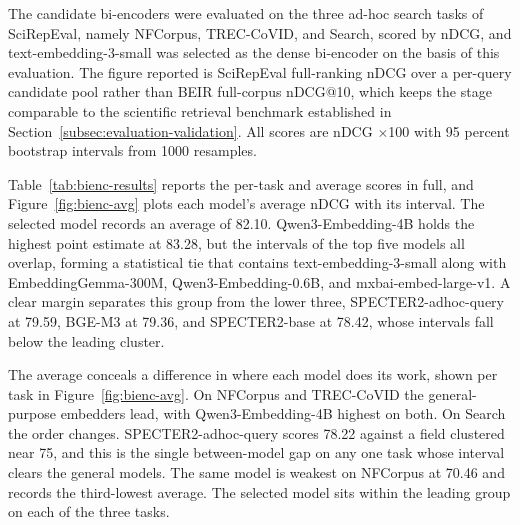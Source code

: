 The candidate bi-encoders were evaluated on the three ad-hoc search tasks of SciRepEval, namely NFCorpus, TREC-CoVID, and Search, scored by nDCG, and text-embedding-3-small was selected as the dense bi-encoder on the basis of this evaluation. The figure reported is SciRepEval full-ranking nDCG over a per-query candidate pool rather than BEIR full-corpus nDCG@10, which keeps the stage comparable to the scientific retrieval benchmark established in Section~\ref{subsec:evaluation-validation}. All scores are nDCG $\times$100 with 95 percent bootstrap intervals from 1000 resamples.

Table~\ref{tab:bienc-results} reports the per-task and average scores in full, and Figure~\ref{fig:bienc-avg} plots each model's average nDCG with its interval. The selected model records an average of 82.10. Qwen3-Embedding-4B holds the highest point estimate at 83.28, but the intervals of the top five models all overlap, forming a statistical tie that contains text-embedding-3-small along with EmbeddingGemma-300M, Qwen3-Embedding-0.6B, and mxbai-embed-large-v1. A clear margin separates this group from the lower three, SPECTER2-adhoc-query at 79.59, BGE-M3 at 79.36, and SPECTER2-base at 78.42, whose intervals fall below the leading cluster.

The average conceals a difference in where each model does its work, shown per task in Figure~\ref{fig:bienc-avg}. On NFCorpus and TREC-CoVID the general-purpose embedders lead, with Qwen3-Embedding-4B highest on both. On Search the order changes. SPECTER2-adhoc-query scores 78.22 against a field clustered near 75, and this is the single between-model gap on any one task whose interval clears the general models. The same model is weakest on NFCorpus at 70.46 and records the third-lowest average. The selected model sits within the leading group on each of the three tasks.

